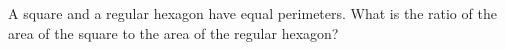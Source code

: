 A square and a regular hexagon have equal perimeters. What is the ratio of the area of the square to the area of the regular hexagon?
